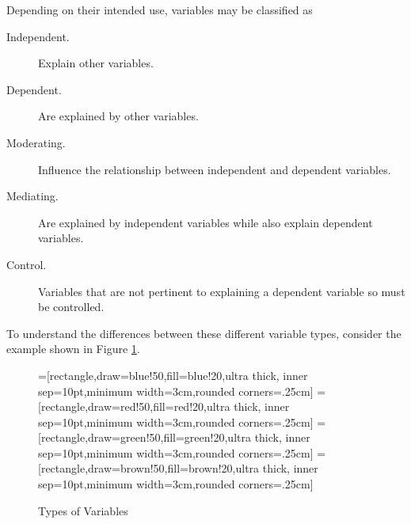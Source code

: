 Depending on their intended use, variables may be classified as 

\begin{description}
	\item[Independent.] Explain other variables.
	\item[Dependent.] Are explained by other variables.
	\item[Moderating.] Influence the relationship between independent and dependent variables.
	\item[Mediating.] Are explained by independent variables while also explain dependent variables.
	\item[Control.] Variables that are not pertinent to explaining a dependent variable so must be controlled.
\end{description}

To understand the differences between these different variable types, consider the example shown in Figure \ref{02:fig03}. 

\begin{center}
	\begin{figure}[H]
		=[rectangle,draw=blue!50,fill=blue!20,ultra thick,
		inner sep=10pt,minimum width=3cm,rounded corners=.25cm]
		=[rectangle,draw=red!50,fill=red!20,ultra thick,
		inner sep=10pt,minimum width=3cm,rounded corners=.25cm]
		=[rectangle,draw=green!50,fill=green!20,ultra thick,
		inner sep=10pt,minimum width=3cm,rounded corners=.25cm]
		=[rectangle,draw=brown!50,fill=brown!20,ultra thick,
		inner sep=10pt,minimum width=3cm,rounded corners=.25cm]
		\caption{Types of Variables}
		\label{02:fig03}
	\end{figure}
\end{center}

